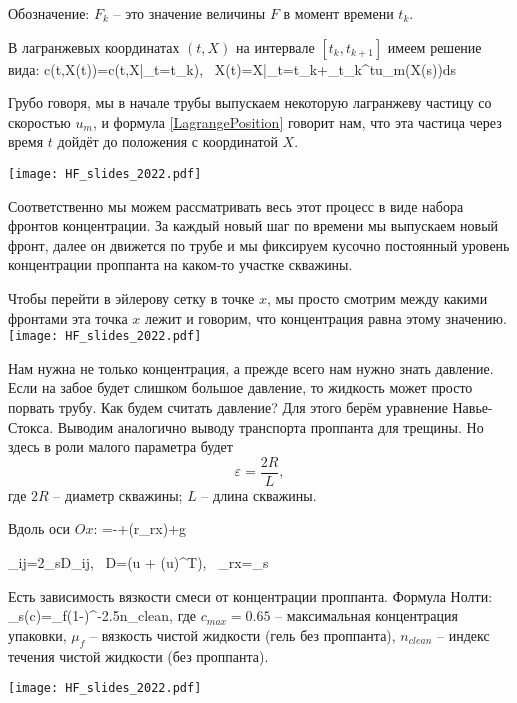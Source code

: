 \documentclass[main.tex]{subfiles}
\begin{document}
Обозначение: $F_k$ -- это значение величины $F$ в момент времени $t_k$.

В лагранжевых координатах $(t,X)$ на интервале $[t_k, t_{k+1}]$ имеем решение вида:
\beq\label{LagrangePosition}
c(t,X(t))=c(t,X|_{t=t_k}),\,\,\,\,\,X(t)=X|_{t=t_k}+\int\limits_{t_k}^{t}u_m(X(s))ds
\eeq

Грубо говоря, мы в начале трубы выпускаем некоторую лагранжеву частицу со скоростью $u_m$, и формула \eqref{LagrangePosition} говорит нам, что эта частица через время $t$ дойдёт до положения с координатой $X$.

\texttt{[image: HF\_slides\_2022.pdf]}

Соответственно мы можем рассматривать весь этот процесс в виде набора фронтов концентрации.
За каждый новый шаг по времени мы выпускаем новый фронт, далее он движется по трубе и мы фиксируем кусочно постоянный уровень концентрации проппанта на каком-то участке скважины.

Чтобы перейти в эйлерову сетку в точке $x$, мы просто смотрим между какими фронтами эта точка $x$ лежит и говорим, что концентрация равна этому значению.
\\

\texttt{[image: HF\_slides\_2022.pdf]}

Нам нужна не только концентрация, а прежде всего нам нужно знать давление.
Если на забое будет слишком большое давление, то жидкость может просто порвать трубу.
Как будем считать давление?
Для этого берём уравнение Навье-Стокса.
Выводим аналогично выводу транспорта проппанта для трещины.
Но здесь в роли малого параметра будет
$$\varepsilon=\frac{2R}{L},$$
где $2R$ -- диаметр скважины; $L$ -- длина скважины.

Вдоль оси $Ox$:
=-+\left(r\tau_{rx}\right)+\rho g\sin\theta
\eeq

\beq
\tau_{ij}=2\mu_sD_{ij},\,\,\,\,\,D=\left(\nabla u + (\nabla u)^T\right),\,\,\,\,\,\tau_{rx}=\mu_s
\eeq

Есть зависимость вязкости смеси от концентрации проппанта.
Формула Нолти:
\beq
\mu_s(c)=\mu_f\left(1-\right)^{-2.5n_{clean}},
\eeq
где $c_{max}=0.65$ -- максимальная концентрация упаковки, $\mu_f$ -- вязкость чистой жидкости (гель без проппанта), $n_{clean}$ -- индекс течения чистой жидкости (без проппанта).

\texttt{[image: HF\_slides\_2022.pdf]}
\end{document}

